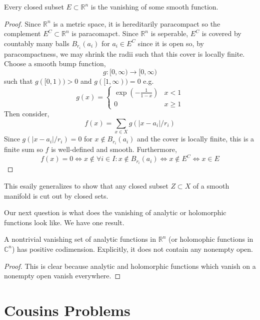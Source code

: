 \documentclass[12pt]{article}
\begin{document}
\newcommand{\R}{\mathbb{R}}

\begin{theorem}
Every closed subset $E \subset \R^n$ is the vanishing of some smooth function.
\end{theorem}

\begin{proof}
Since $\R^n$ is a metric space, it is hereditarily paracompact so the complement $E^C \subset \R^n$ is paracomapct. Since $\R^n$ is seperable, $E^C$ is covered by countably many balls $B_{r_i}(a_i)$ for $a_i \in E^C$ since it is open so, by paracompactness, we may shrink the radii such that this cover is locally finite. Choose a smooth bump function, 
\[ g : [0, \infty) \to [0, \infty) \]
such that $g([0, 1)) > 0$ and $g([1, \infty)) = 0$ e.g. 
\[ g(x) = 
\begin{cases}
\exp{\left( - \frac{1}{1 - x} \right)} & x < 1
\\
0 & x \ge 1
\end{cases} \]
Then consider,
\[ f(x) = \sum_{x \in X} g(|x - a_i|/r_i) \]
Since $g(|x - a_i|/r_i) = 0$ for $x \notin B_{r_i}(a_i)$ and the cover is locally finite, this is a finite sum so $f$ is well-defined and smooth. Furthermore, 
\[ f(x) = 0 \iff x \notin \forall i \in I : x \notin B_{r_i}(a_i) \iff x \notin E^C \iff x \in E \]
\end{proof}

\begin{rmk}
This esaily generalizes to show that any closed subset $Z \subset X$ of a smooth manifold is cut out by closed sets.
\end{rmk}
\noindent
Our next question is what does the vanishing of analytic or holomorphic functions look like. We have one result.

\begin{prop}
A nontrivial vanishing set of analytic functions in $\R^n$ (or holomophic functions in $\mathbb{C}^n$) has positive codimension. Explicitly, it does not contain any nonempty open. 
\end{prop}

\begin{proof}
This is clear because analytic and holomorphic functions which vanish on a nonempty open vanish everywhere. 
\end{proof}

\section{Cousins Problems}
\end{document}
